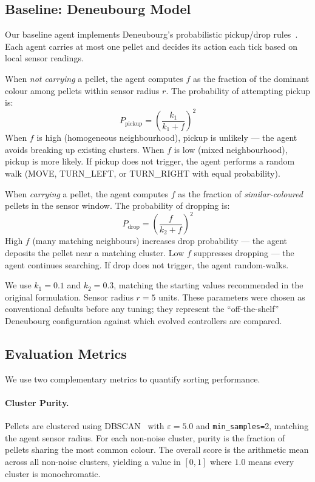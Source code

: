 \documentclass[11pt,a4paper]{article}
\begin{document}
\subsection{Baseline: Deneubourg Model}
\label{sec:methods:baseline}

Our baseline agent implements Deneubourg's probabilistic pickup/drop rules~\cite{deneubourg1990}. Each agent carries at most one pellet and decides its action each tick based on local sensor readings.

When \emph{not carrying} a pellet, the agent computes $f$ as the fraction of the dominant colour among pellets within sensor radius $r$. The probability of attempting pickup is:
\[
P_{\text{pickup}} = \left(\frac{k_1}{k_1 + f}\right)^2
\]
When $f$ is high (homogeneous neighbourhood), pickup is unlikely --- the agent avoids breaking up existing clusters. When $f$ is low (mixed neighbourhood), pickup is more likely. If pickup does not trigger, the agent performs a random walk (MOVE, TURN\_LEFT, or TURN\_RIGHT with equal probability).

When \emph{carrying} a pellet, the agent computes $f$ as the fraction of \emph{similar-coloured} pellets in the sensor window. The probability of dropping is:
\[
P_{\text{drop}} = \left(\frac{f}{k_2 + f}\right)^2
\]
High $f$ (many matching neighbours) increases drop probability --- the agent deposits the pellet near a matching cluster. Low $f$ suppresses dropping --- the agent continues searching. If drop does not trigger, the agent random-walks.

We use $k_1 = 0.1$ and $k_2 = 0.3$, matching the starting values recommended in the original formulation. Sensor radius $r = 5$ units. These parameters were chosen as conventional defaults before any tuning; they represent the ``off-the-shelf'' Deneubourg configuration against which evolved controllers are compared.

\subsection{Evaluation Metrics}
\label{sec:methods:metrics}

We use two complementary metrics to quantify sorting performance.

\paragraph{Cluster Purity.} Pellets are clustered using DBSCAN~\cite{ester1996} with $\varepsilon\!=\!5.0$ and \texttt{min\_samples}\texttt{=}2, matching the agent sensor radius. For each non-noise cluster, purity is the fraction of pellets sharing the most common colour. The overall score is the arithmetic mean across all non-noise clusters, yielding a value in $[0,1]$ where $1.0$ means every cluster is monochromatic.
\end{document}
